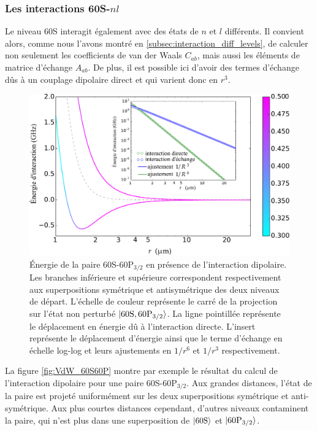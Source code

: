 \subsubsection*{Les interactions 60S-$nl$}
Le niveau 60S interagit également avec des états de $n$ et $l$ différents.
Il convient alors, comme nous l'avons montré en \eqref{subsec:interaction_diff_levels}, de calculer non seulement les coefficients de van der Waals $C_{ab}$, mais aussi les éléments de matrice d'échange $A_{ab}$.
De plus, il est possible ici d'avoir des termes d'échange dûs à un couplage dipolaire direct et qui varient donc en $r^3$.

\begin{figure}[!h]
\centering
\includegraphics[width=0.8\linewidth]{figures/theory/VdW_60S60P}
\caption[Interaction dipolaire 60S-60P$_{3/2}$]{Énergie de la paire 60S-60P$_{3/2}$ en présence de l'interaction dipolaire.
Les branches inférieure et supérieure correspondent respectivement aux superpositions symétrique et antisymétrique des deux niveaux de départ.
L'échelle de couleur représente le carré de la projection sur l'état non perturbé $\ket{60\text{S},60\text{P}_{3/2}}$.
La ligne pointillée représente le déplacement en énergie dû à l'interaction directe.
L'insert représente le déplacement d'énergie ainsi que le terme d'échange en échelle log-log et leurs ajustements en $1/r^6$ et $1/r^3$ respectivement.
}
\label{fig:VdW_60S60P}
\end{figure}

La figure \eqref{fig:VdW_60S60P} montre par exemple le résultat du calcul de l'interaction dipolaire pour une paire 60S-60P$_{3/2}$.
Aux grandes distances, l'état de la paire est projeté uniformément sur les deux superpositions symétrique et anti-symétrique.
Aux plus courtes distances cependant, d'autres niveaux contaminent la paire, qui n'est plus dans une superposition de $\ket{60\text{S}}$ et $\ket{60\text{P}_{3/2}}$.

